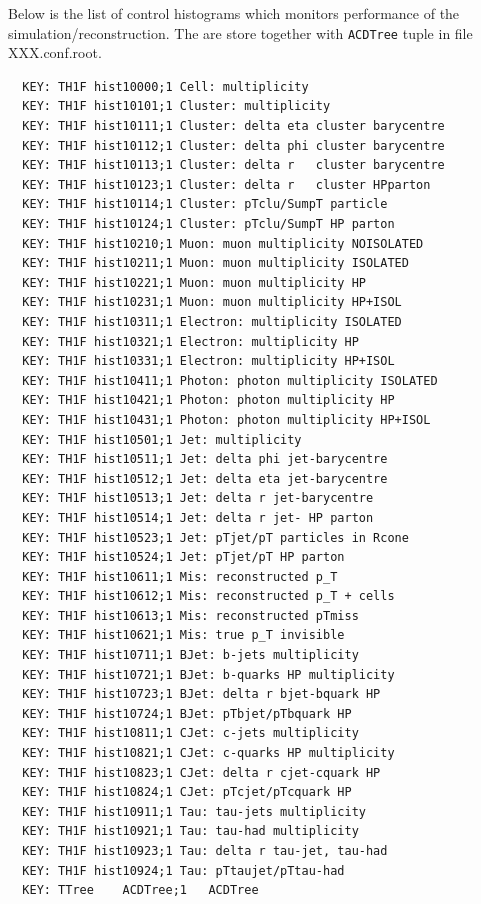 Below is the list of control histograms which monitors performance of
the simulation/reconstruction. The are store together with {\tt ACDTree}
tuple in file XXX.conf.root.
\scriptsize{
\begin{verbatim}  
  KEY: TH1F	hist10000;1	Cell: multiplicity
  KEY: TH1F	hist10101;1	Cluster: multiplicity
  KEY: TH1F	hist10111;1	Cluster: delta eta cluster barycentre
  KEY: TH1F	hist10112;1	Cluster: delta phi cluster barycentre
  KEY: TH1F	hist10113;1	Cluster: delta r   cluster barycentre
  KEY: TH1F	hist10123;1	Cluster: delta r   cluster HPparton
  KEY: TH1F	hist10114;1	Cluster: pTclu/SumpT particle
  KEY: TH1F	hist10124;1	Cluster: pTclu/SumpT HP parton
  KEY: TH1F	hist10210;1	Muon: muon multiplicity NOISOLATED
  KEY: TH1F	hist10211;1	Muon: muon multiplicity ISOLATED
  KEY: TH1F	hist10221;1	Muon: muon multiplicity HP
  KEY: TH1F	hist10231;1	Muon: muon multiplicity HP+ISOL
  KEY: TH1F	hist10311;1	Electron: multiplicity ISOLATED
  KEY: TH1F	hist10321;1	Electron: multiplicity HP
  KEY: TH1F	hist10331;1	Electron: multiplicity HP+ISOL
  KEY: TH1F	hist10411;1	Photon: photon multiplicity ISOLATED
  KEY: TH1F	hist10421;1	Photon: photon multiplicity HP
  KEY: TH1F	hist10431;1	Photon: photon multiplicity HP+ISOL
  KEY: TH1F	hist10501;1	Jet: multiplicity
  KEY: TH1F	hist10511;1	Jet: delta phi jet-barycentre
  KEY: TH1F	hist10512;1	Jet: delta eta jet-barycentre
  KEY: TH1F	hist10513;1	Jet: delta r jet-barycentre
  KEY: TH1F	hist10514;1	Jet: delta r jet- HP parton
  KEY: TH1F	hist10523;1	Jet: pTjet/pT particles in Rcone
  KEY: TH1F	hist10524;1	Jet: pTjet/pT HP parton
  KEY: TH1F	hist10611;1	Mis: reconstructed p_T 
  KEY: TH1F	hist10612;1	Mis: reconstructed p_T + cells
  KEY: TH1F	hist10613;1	Mis: reconstructed pTmiss
  KEY: TH1F	hist10621;1	Mis: true p_T invisible
  KEY: TH1F	hist10711;1	BJet: b-jets multiplicity
  KEY: TH1F	hist10721;1	BJet: b-quarks HP multiplicity
  KEY: TH1F	hist10723;1	BJet: delta r bjet-bquark HP
  KEY: TH1F	hist10724;1	BJet: pTbjet/pTbquark HP
  KEY: TH1F	hist10811;1	CJet: c-jets multiplicity
  KEY: TH1F	hist10821;1	CJet: c-quarks HP multiplicity
  KEY: TH1F	hist10823;1	CJet: delta r cjet-cquark HP
  KEY: TH1F	hist10824;1	CJet: pTcjet/pTcquark HP
  KEY: TH1F	hist10911;1	Tau: tau-jets multiplicity
  KEY: TH1F	hist10921;1	Tau: tau-had multiplicity 
  KEY: TH1F	hist10923;1	Tau: delta r tau-jet, tau-had 
  KEY: TH1F	hist10924;1	Tau: pTtaujet/pTtau-had 
  KEY: TTree	ACDTree;1	ACDTree                 
\end{verbatim}  
}



















